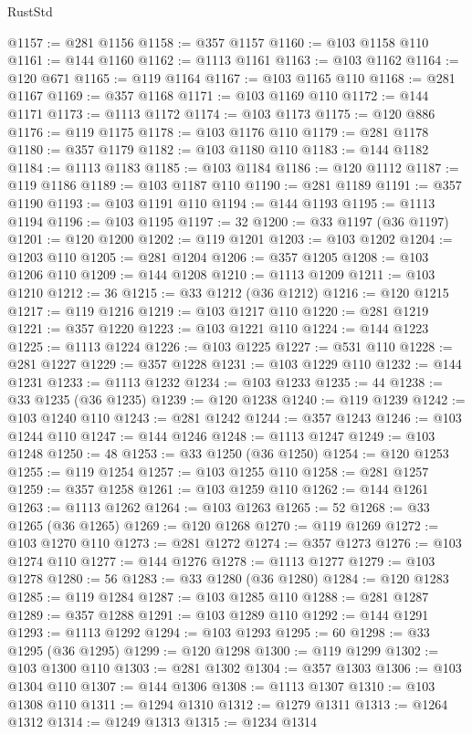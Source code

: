 \begin{lexlean}{RustStd}
\begin{coremodule}
@1157 := @281 @1156
@1158 := @357 @1157
@1160 := @103 @1158 @110
@1161 := @144 @1160
@1162 := @1113 @1161
@1163 := @103 @1162
@1164 := @120 @671
@1165 := @119 @1164
@1167 := @103 @1165 @110
@1168 := @281 @1167
@1169 := @357 @1168
@1171 := @103 @1169 @110
@1172 := @144 @1171
@1173 := @1113 @1172
@1174 := @103 @1173
@1175 := @120 @886
@1176 := @119 @1175
@1178 := @103 @1176 @110
@1179 := @281 @1178
@1180 := @357 @1179
@1182 := @103 @1180 @110
@1183 := @144 @1182
@1184 := @1113 @1183
@1185 := @103 @1184
@1186 := @120 @1112
@1187 := @119 @1186
@1189 := @103 @1187 @110
@1190 := @281 @1189
@1191 := @357 @1190
@1193 := @103 @1191 @110
@1194 := @144 @1193
@1195 := @1113 @1194
@1196 := @103 @1195
@1197 := 32
@1200 := @33 @1197 (@36 @1197)
@1201 := @120 @1200
@1202 := @119 @1201
@1203 := @103 @1202
@1204 := @1203 @110
@1205 := @281 @1204
@1206 := @357 @1205
@1208 := @103 @1206 @110
@1209 := @144 @1208
@1210 := @1113 @1209
@1211 := @103 @1210
@1212 := 36
@1215 := @33 @1212 (@36 @1212)
@1216 := @120 @1215
@1217 := @119 @1216
@1219 := @103 @1217 @110
@1220 := @281 @1219
@1221 := @357 @1220
@1223 := @103 @1221 @110
@1224 := @144 @1223
@1225 := @1113 @1224
@1226 := @103 @1225
@1227 := @531 @110
@1228 := @281 @1227
@1229 := @357 @1228
@1231 := @103 @1229 @110
@1232 := @144 @1231
@1233 := @1113 @1232
@1234 := @103 @1233
@1235 := 44
@1238 := @33 @1235 (@36 @1235)
@1239 := @120 @1238
@1240 := @119 @1239
@1242 := @103 @1240 @110
@1243 := @281 @1242
@1244 := @357 @1243
@1246 := @103 @1244 @110
@1247 := @144 @1246
@1248 := @1113 @1247
@1249 := @103 @1248
@1250 := 48
@1253 := @33 @1250 (@36 @1250)
@1254 := @120 @1253
@1255 := @119 @1254
@1257 := @103 @1255 @110
@1258 := @281 @1257
@1259 := @357 @1258
@1261 := @103 @1259 @110
@1262 := @144 @1261
@1263 := @1113 @1262
@1264 := @103 @1263
@1265 := 52
@1268 := @33 @1265 (@36 @1265)
@1269 := @120 @1268
@1270 := @119 @1269
@1272 := @103 @1270 @110
@1273 := @281 @1272
@1274 := @357 @1273
@1276 := @103 @1274 @110
@1277 := @144 @1276
@1278 := @1113 @1277
@1279 := @103 @1278
@1280 := 56
@1283 := @33 @1280 (@36 @1280)
@1284 := @120 @1283
@1285 := @119 @1284
@1287 := @103 @1285 @110
@1288 := @281 @1287
@1289 := @357 @1288
@1291 := @103 @1289 @110
@1292 := @144 @1291
@1293 := @1113 @1292
@1294 := @103 @1293
@1295 := 60
@1298 := @33 @1295 (@36 @1295)
@1299 := @120 @1298
@1300 := @119 @1299
@1302 := @103 @1300 @110
@1303 := @281 @1302
@1304 := @357 @1303
@1306 := @103 @1304 @110
@1307 := @144 @1306
@1308 := @1113 @1307
@1310 := @103 @1308 @110
@1311 := @1294 @1310
@1312 := @1279 @1311
@1313 := @1264 @1312
@1314 := @1249 @1313
@1315 := @1234 @1314

\end{coremodule}
\end{lexlean}

